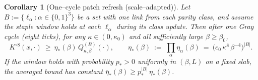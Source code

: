 \documentclass[11pt]{amsart}
\theoremstyle{plain}
\newtheorem{corollary}[theorem]{Corollary}
\theoremstyle{definition}
\theoremstyle{remark}
\begin{document}
\begin{corollary}[One--cycle patch refresh (scale--adapted)]\label{cor:patch-scale}
Let $B:=\{\ell_\alpha: \alpha\in\{0,1\}^3\}$ be a set with one link from each parity class, and assume the staple window holds at each $\ell_\alpha$ during its class update. Then after one Gray cycle (eight ticks), for any $\kappa\in(0,\kappa_0)$ and all sufficiently large $\beta\ge \beta_0$,
\[
  K^{\circ 8}(x,\cdot)\ \ge\ \eta_*(\beta)\, Q^{(B)}_{\kappa,\beta}(\cdot),\qquad \eta_*(\beta)\ :=\ \prod_{\alpha}\eta_\alpha(\beta)\ =\ \big(c_0\,\kappa^{8}\,\beta^{-4}\big)^{|B|}.
\]
If the window holds with probability $p_*>0$ uniformly in $(\beta,L)$ on a fixed slab, the averaged bound has constant $\bar\eta_*(\beta)\ge p_*^{|B|}\,\eta_*(\beta)$.
\end{corollary}
\end{document}
